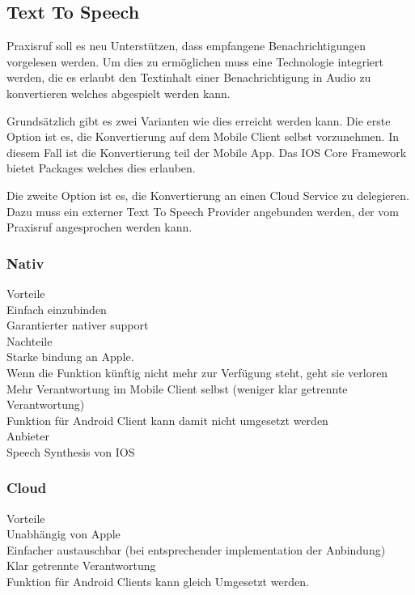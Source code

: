\subsection{Text To Speech}

Praxisruf soll es neu Unterstützen, dass empfangene Benachrichtigungen vorgelesen werden.
Um dies zu ermöglichen muss eine Technologie integriert werden, die es erlaubt den Textinhalt einer Benachrichtigung
in Audio zu konvertieren welches abgespielt werden kann.

Grundsätzlich gibt es zwei Varianten wie dies erreicht werden kann.
Die erste Option ist es, die Konvertierung auf dem Mobile Client selbst vorzunehmen.
In diesem Fall ist die Konvertierung teil der Mobile App.
Das IOS Core Framework bietet Packages welches dies erlauben.

Die zweite Option ist es, die Konvertierung an einen Cloud Service zu delegieren.
Dazu muss ein externer Text To Speech Provider angebunden werden, der vom Praxisruf angesprochen werden kann.


\subsubsection{Nativ}

Vorteile \\

Einfach einzubinden \\
Garantierter nativer support \\

Nachteile \\

Starke bindung an Apple. \\
Wenn die Funktion künftig nicht mehr zur Verfügung steht, geht sie verloren \\
Mehr Verantwortung im Mobile Client selbst (weniger klar getrennte Verantwortung) \\
Funktion für Android Client kann damit nicht umgesetzt werden \\


Anbieter \\
Speech Synthesis von IOS\cite{ios_speech_synthesis}

\subsubsection{Cloud}

Vorteile \\

Unabhängig von Apple \\
Einfacher austauschbar (bei entsprechender implementation der Anbindung) \\
Klar getrennte Verantwortung \\
Funktion für Android Clients kann gleich Umgesetzt werden.

